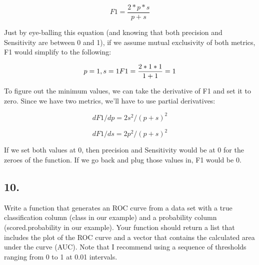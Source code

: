 \documentclass[
]{article}
\begin{document}
\[
F1 = \frac{2*p*s}{p + s}
\]

Just by eye-balling this equation (and knowing that both precision and
Sensitivity are between 0 and 1), if we assume mutual exclusivity of
both metrics, F1 would simplify to the following:

\[
p = 1, s = 1
\\
F1 = \frac{2*1*1}{1+1} = 1
\]

To figure out the minimum values, we can take the derivative of F1 and
set it to zero. Since we have two metrics, we'll have to use partial
derivatives:

\[
dF1/dp = 2s^2/(p+s)^2
\]

\[
dF1/ds = 2p^2/(p+s)^2
\]

If we set both values at 0, then precision and Sensitivity would be at 0
for the zeroes of the function. If we go back and plug those values in,
F1 would be 0.

\hypertarget{section}{%
\subsection{10.}\label{section}}

Write a function that generates an ROC curve from a data set with a true
classification column (class in our example) and a probability column
(scored.probability in our example). Your function should return a list
that includes the plot of the ROC curve and a vector that contains the
calculated area under the curve (AUC). Note that I recommend using a
sequence of thresholds ranging from 0 to 1 at 0.01 intervals.
\end{document}
